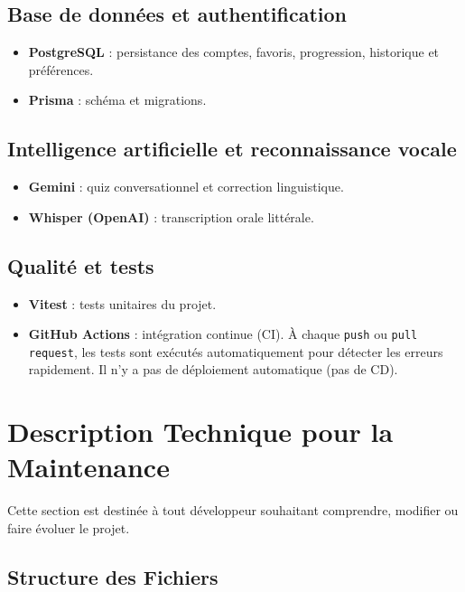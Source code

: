 \documentclass[12pt,twoside,letterpaper]{article}
\begin{document}
\subsection{Base de donn\'ees et authentification}
\begin{itemize}[leftmargin=*]
  \item \textbf{PostgreSQL} : persistance des comptes, favoris, progression, historique et pr\'ef\'erences.
  \item \textbf{Prisma} : sch\'ema et migrations.
\end{itemize}

\subsection{Intelligence artificielle et reconnaissance vocale}
\begin{itemize}[leftmargin=*]
  \item \textbf{Gemini} : quiz conversationnel et correction linguistique.
  \item \textbf{Whisper (OpenAI)} : transcription orale litt\'erale.
\end{itemize}

\subsection{Qualit\'e et tests}
\begin{itemize}[leftmargin=*]
  \item \textbf{Vitest} : tests unitaires du projet.
  \item \textbf{GitHub Actions} : int\'egration continue (CI).
  \`A chaque \texttt{push} ou \texttt{pull request},
  les tests sont ex\'ecut\'es automatiquement pour d\'etecter les erreurs rapidement.
  Il n'y a pas de d\'eploiement automatique (pas de CD).
\end{itemize}

\newpage

\section{Description Technique pour la Maintenance}

Cette section est destin\'ee \`a tout d\'eveloppeur souhaitant comprendre,
modifier ou faire \'evoluer le projet.

\subsection{Structure des Fichiers}
\end{document}
